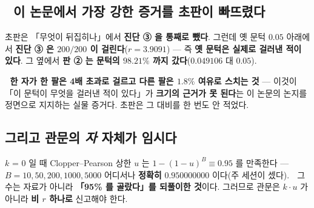 \documentclass{article}
\begin{document}
\subsection{🔴 이 논문에서 가장 강한 증거를 초판이 빠뜨렸다}

초판은 「무엇이 뒤집히나」에서 \textbf{진단 ③ 을 통째로 뺐다}. 그런데 옛 문턱 $0.05$ 아래에서
\textbf{진단 ③ 은 $200/200$ 이 걸린다}($r = 3.9091$) --- 즉 \textbf{옛 문턱은 실제로 걸러낸 적이 있다}.
그 옆에서 \textbf{판 ② 는 문턱의 $\mathbf{98.21\%}$ 까지 갔다}($0.049106$ 대 $0.05$).

🔴 \textbf{한 자가 한 팔은 4배 초과로 걸르고 다른 팔은 $1.8\%$ 여유로 스치는 것} ---
이것이 「이 문턱이 무엇을 걸러낸 적이 있다」가 \textbf{크기의 근거가 못 된다}는 이 논문의 논지를
정면으로 지지하는 실물 증거다. 초판은 그 대비를 한 번도 안 적었다.

\subsection{그리고 관문의 \emph{자} 자체가 임시다}

$k$ = $0$ 일 때 Clopper--Pearson 상한 $u$ 는 $1-(1-u)^B \equiv 0.95$ 를 만족한다 ---
$B = 10, 50, 200, 1000, 5000$ 어디서나 \textbf{정확히} $0.950000000$ 이다(주 세션이 셌다).
🔴 그 수는 자료가 아니라 \textbf{「95\% 를 골랐다」를 되풀이한 것}이다.
그러므로 관문은 $k \cdot u$ 가 아니라 \textbf{비 $r$ 하나로} 신고해야 한다.
\end{document}
